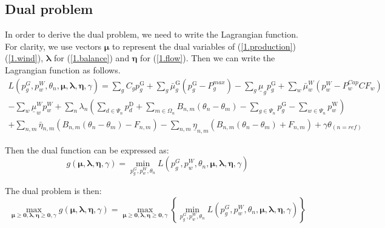 \subsection{Dual problem}

In order to derive the dual problem, we need to write the Lagrangian function. For clarity, we use vectors $\boldsymbol{\mu}$ to represent the dual variables of (\ref{1.production})(\ref{1.wind}), $\boldsymbol{\lambda}$ for (\ref{1.balance}) and  $\boldsymbol{\eta}$ for (\ref{1.flow}). Then we can write the Lagrangian function as follows.
\begin{equation}
\begin{split}
    L(p_{g}^{G}, p_w^W, \theta_{n}, \boldsymbol{\mu},\boldsymbol{\lambda}, \boldsymbol{\eta}, \gamma) = \sum_{g} C_{g} p_{g}^{\mathrm{G}} + \sum_{g} \bar{\mu}_{g}^{\mathrm{G}}(p_{g}^{\mathrm{G}}-P_g^{max}) - \sum_{g}\underline{\mu}_{g}p_{g}^{\mathrm{G}} +\sum_w\bar{\mu}_w^W(p_w^W-P_w^{Cap}CF_w) \\ - \sum_w\underline{\mu}_w^W p_w^W + \sum_n \lambda_{n}(\sum_{d \in \Psi_{n}} p_{d}^{\mathrm{D}}+\sum_{m \in \Omega_{n}} B_{n, m}\left(\theta_{n}-\theta_{m}\right)-\sum_{g \in \Psi_{n}} p_{g}^{\mathrm{G}}- \sum_{w \in \Psi_{n}} p_{w}^{\mathrm{W}})\\+ \sum_{n, m} \bar{\eta}_{n, m}(B_{n, m}\left(\theta_{n}-\theta_{m}\right)-F_{n,m}) -\sum_{n, m} \underline{\eta}_{n, m}(B_{n, m}\left(\theta_{n}-\theta_{m}\right)+F_{n,m}) + \gamma \theta_{(n=r e f)}
\end{split}
\end{equation}

Then the dual function can be expressed as:
\begin{equation}
    g(\boldsymbol{\mu},\boldsymbol{\lambda}, \boldsymbol{\eta}, \gamma) = \underset{p_{g}^{G}, p_w^W, \theta_{n}} \min L(p_{g}^{G}, p_w^W, \theta_{n}, \boldsymbol{\mu},\boldsymbol{\lambda}, \boldsymbol{\eta}, \gamma) 
\end{equation}

The dual problem is then:
\begin{equation} \label{1.dualProblem}
    \underset{\boldsymbol{\mu}\geq\boldsymbol{0},\boldsymbol{\lambda}, \boldsymbol{\eta}\geq\boldsymbol{0}, \gamma}{\max}g(\boldsymbol{\mu},\boldsymbol{\lambda}, \boldsymbol{\eta}, \gamma) =     \underset{\boldsymbol{\mu}\geq\boldsymbol{0},\boldsymbol{\lambda}, \boldsymbol{\eta}\geq\boldsymbol{0}, \gamma}{\max} \left\{ \underset{p_{g}^{G}, p_w^W, \theta_{n}} \min L(p_{g}^{G}, p_w^W, \theta_{n}, \boldsymbol{\mu},\boldsymbol{\lambda}, \boldsymbol{\eta}, \gamma)  \right\}
\end{equation}

